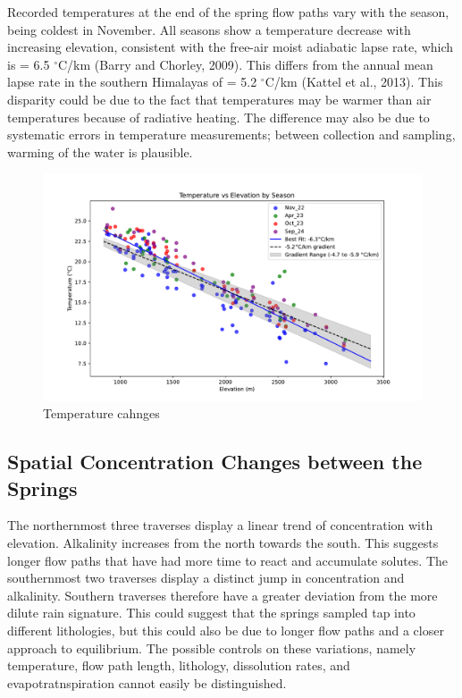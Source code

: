 \FloatBarrier

\bsk

Recorded temperatures at the end of the spring flow paths vary with the season, being coldest in November. All seasons show a temperature decrease with increasing elevation, consistent with the free-air moist adiabatic lapse rate, which is = 6.5 $^{\circ}$C/km (Barry and Chorley, 2009). This differs from the annual mean lapse rate in the southern Himalayas of = 5.2 $^{\circ}$C/km (Kattel et al., 2013). This disparity could be due to the fact that temperatures may be warmer than air temperatures because of radiative heating. The difference may also be due to systematic errors in temperature measurements; between collection and sampling, warming of the water is plausible.



\begin{figure}[h]
    \centering
    \includegraphics[width=\textwidth]{Temperature_Elevation_Season.pdf}
    \caption{Temperature cahnges}
    \label{fig:seasonal_change2}
\end{figure}

\FloatBarrier

\newpage


\subsection{Spatial Concentration Changes between the Springs}

The northernmost three traverses display a linear trend of concentration with elevation. Alkalinity increases from the north towards the south. This suggests longer flow paths that have had more time to react and accumulate solutes. The southernmost two traverses display a distinct jump in concentration and alkalinity. Southern traverses therefore have a greater deviation from the more dilute rain signature. This could suggest that the springs sampled tap into different lithologies, but this could also be due to longer flow paths and a closer approach to equilibrium. The possible controls on these variations, namely temperature, flow path length, lithology, dissolution rates, and evapotratnspiration cannot easily be distinguished.

